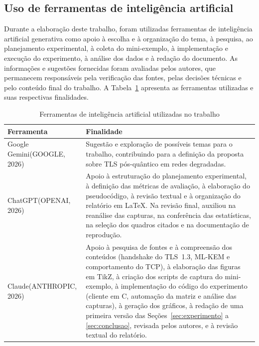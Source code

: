 \documentclass[12pt,a4paper]{article}
\newcommand{\fonte}[1]{\par\vspace{4pt}{\small Fonte: #1}}
\begin{document}

\endgroup

\subsection*{Uso de ferramentas de inteligência artificial}

Durante a elaboração deste trabalho, foram utilizadas ferramentas de
inteligência artificial generativa como apoio à escolha e à organização do
tema, à pesquisa, ao planejamento experimental, à coleta do mini-exemplo,
à implementação e execução do experimento, à análise dos dados e à
redação do documento. As informações e
sugestões fornecidas foram avaliadas pelos autores, que permanecem
responsáveis pela verificação das fontes, pelas decisões técnicas e pelo
conteúdo final do trabalho. A Tabela~\ref{tab:uso-ia} apresenta as ferramentas
utilizadas e suas respectivas finalidades.

\begin{table}[H]
\centering
\caption{Ferramentas de inteligência artificial utilizadas no trabalho}
\label{tab:uso-ia}
\begin{tabular}{p{3.8cm}p{9.2cm}}
\toprule
Ferramenta & Finalidade \\
\midrule
Google Gemini\newline (GOOGLE, 2026) & Sugestão e exploração de possíveis temas para o trabalho,
contribuindo para a definição da proposta sobre TLS pós-quântico em redes
degradadas. \\
\addlinespace
ChatGPT\newline (OPENAI, 2026) & Apoio à estruturação do planejamento experimental, à
definição das métricas de avaliação, à elaboração do pseudocódigo, à revisão
textual e à organização do relatório em \LaTeX{}. Na revisão final, auxiliou na
reanálise das capturas, na conferência das estatísticas, na seleção dos quadros
citados e na documentação de reprodução. \\
\addlinespace
Claude\newline (ANTHROPIC, 2026) & Apoio à pesquisa de fontes e à compreensão dos
conteúdos (handshake do TLS~1.3, ML-KEM e comportamento do TCP), à
elaboração das figuras em TikZ, à criação dos scripts de captura do
mini-exemplo, à implementação do código do experimento (cliente em C,
automação da matriz e análise das capturas), à geração dos gráficos, à
redação de uma primeira versão das Seções~\ref{sec:experimento} a
\ref{sec:conclusao}, revisada pelos autores, e à revisão textual do
relatório. \\
\bottomrule
\end{tabular}
\fonte{Elaborado pelos autores (2026).}
\end{table}
\end{document}
